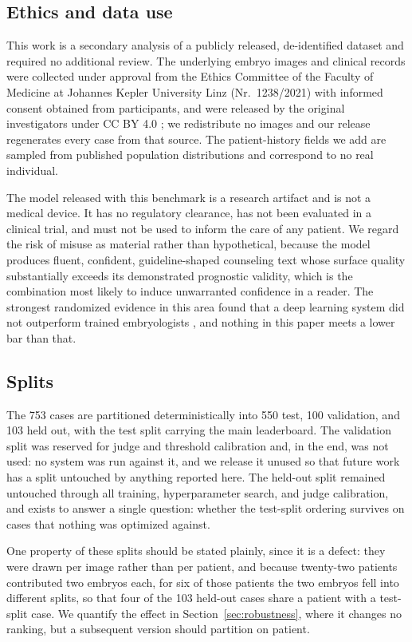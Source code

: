 \documentclass[11pt]{article}
\begin{document}
\subsection{Ethics and data use}
\label{sec:ethics}

This work is a secondary analysis of a publicly released, de-identified dataset
and required no additional review. The underlying embryo images and clinical
records were collected under approval from the Ethics Committee of the Faculty of
Medicine at Johannes Kepler University Linz (Nr.\ 1238/2021) with informed
consent obtained from participants, and were released by the original
investigators under CC BY 4.0 \citep{kromp2023}; we redistribute no images and
our release regenerates every case from that source. The patient-history fields
we add are sampled from published population distributions and correspond to no
real individual.

The model released with this benchmark is a research artifact and is not a
medical device. It has no regulatory clearance, has not been evaluated in a
clinical trial, and must not be used to inform the care of any patient. We regard
the risk of misuse as material rather than hypothetical, because the model
produces fluent, confident, guideline-shaped counseling text whose surface
quality substantially exceeds its demonstrated prognostic validity, which is the
combination most likely to induce unwarranted confidence in a reader. The
strongest randomized evidence in this area found that a deep learning system did
not outperform trained embryologists \citep{illingworth2024}, and nothing in this
paper meets a lower bar than that.

\subsection{Splits}

The 753 cases are partitioned deterministically into 550 test, 100 validation,
and 103 held out, with the test split carrying the main leaderboard. The
validation split was reserved for judge and threshold calibration and, in the end,
was not used: no system was run against it, and we release it unused so that
future work has a split untouched by anything reported here. The held-out split
remained untouched through all training, hyperparameter search, and judge
calibration, and exists to answer a single question: whether the test-split
ordering survives on cases that nothing was optimized against.

One property of these splits should be stated plainly, since it is a defect: they
were drawn per image rather than per patient, and because twenty-two patients
contributed two embryos each, for six of those patients the two embryos fell into
different splits, so that four of the 103 held-out cases share a patient with a
test-split case. We quantify the effect in Section~\ref{sec:robustness}, where it
changes no ranking, but a subsequent version should partition on patient.
\end{document}
